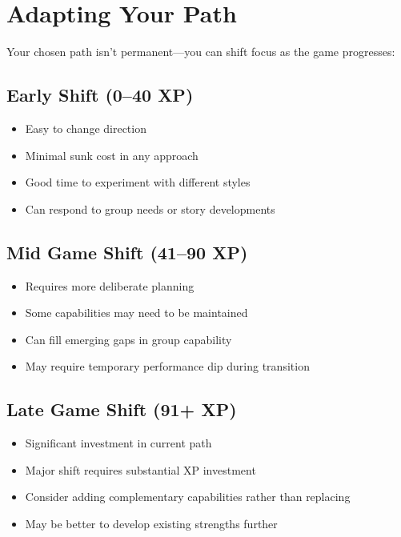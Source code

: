 \documentclass[11pt,twoside,openany]{book}
\begin{document}
\section*{Adapting Your Path} 

Your chosen path isn't permanent—you can shift focus as the game progresses:

\subsection*{Early Shift (0–40 XP)}

\begin{itemize}
\item Easy to change direction
\item Minimal sunk cost in any approach
\item Good time to experiment with different styles
\item Can respond to group needs or story developments
\end{itemize}

\subsection*{Mid Game Shift (41–90 XP)}

\begin{itemize}
\item Requires more deliberate planning
\item Some capabilities may need to be maintained
\item Can fill emerging gaps in group capability
\item May require temporary performance dip during transition
\end{itemize}

\subsection*{Late Game Shift (91+ XP)}

\begin{itemize}
\item Significant investment in current path
\item Major shift requires substantial XP investment
\item Consider adding complementary capabilities rather than replacing
\item May be better to develop existing strengths further
\end{itemize}
\end{document}

